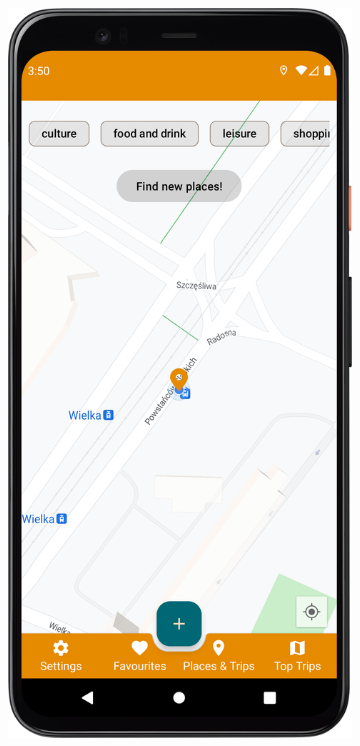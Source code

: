         \vspace{1cm}
        \begin{figure}[H]%
            \centering
            \begin{subfigure}[b]{0.3\textwidth}
                \centering
                \includegraphics[width=\textwidth]{src/app/map_fragment.png}

\end{subfigure}
\end{figure}
